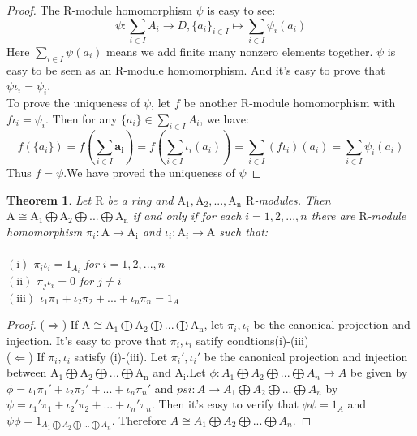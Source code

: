 \documentclass[a4paper]{article}
\newtheorem{myTheo}{Theorem}
\begin{document}
    \begin{proof}
        The $\mathrm{R}$-module homomorphism $\psi$ is easy to see:
        $$
        \psi: \sum_{i\in I}A_i\rightarrow D,\{a_i\}_{i\in I}\mapsto \sum_{i\in I}\psi_i(a_i)
        $$
        Here $\sum_{i\in I}\psi(a_i)$ means we add finite many nonzero elements together. $\psi$ is easy to be seen as an $\mathrm{R}$-module homomorphism. And it's easy to prove that $\psi\iota_i=\psi_i$.\\
        To prove the uniqueness of $\psi$, let $f$ be another $\mathrm{R}$-module homomorphism with $f\iota_i=\psi_i$. Then for any $\{a_i\}\in \sum_{i\in I}A_i$, we have:
        $$
        f(\{a_i\})=f(\sum_{i\in I}\mathbf{a_i})=f(\sum_{i\in I}\iota_i(a_i))=\sum_{i\in I}(f\iota_i)(a_i)=\sum_{i\in I}\psi_i(a_i)
        $$
        Thus $f=\psi$.We have proved the uniqueness of $\psi$
    \end{proof}
    \vspace{0.5cm}
    \begin{myTheo}
        Let $\mathrm{R}$ be a ring and $\mathrm{A_1,A_2,...,A_n}$ $\mathrm{R}$-modules. Then $\mathrm{A}\cong\mathrm{A_1}\bigoplus\mathrm{A_2}\bigoplus...\bigoplus\mathrm{A_n}$ if and only if for each $i=1,2,...,n$ there are $\mathrm{R}$-module homomorphism $\pi_i:\mathrm{A}\rightarrow \mathrm{A_i}$
        and $\iota_i:\mathrm{A}_i\rightarrow \mathrm{A}$ such that:\\
        \vspace{0.05cm}\\
        $\mathrm{(i)}$ $\pi_i\iota_i = 1_{A_i}$ for $i=1,2,...,n$\\
        $\mathrm{(ii)}$ $\pi_j\iota_i=0$ for $j\neq i$\\
        $\mathrm{(iii)}$ $\iota_1\pi_1 + \iota_2\pi_2 +...+\iota_n\pi_n=1_A$
    \end{myTheo}
    \begin{proof}
        ($\Rightarrow$) If $\mathrm{A}\cong \mathrm{A_1}\bigoplus\mathrm{A_2}\bigoplus...\bigoplus\mathrm{A_n}$, let $\pi_i,\iota_i$ be the canonical projection and injection. It's easy to prove
        that $\pi_i,\iota_i$ satify condtions(i)-(iii)\\

        ($\Leftarrow$) If $\pi_i,\iota_i$ satisfy (i)-(iii). Let $\pi_i',\iota_i'$ be the canonical projection and injection between
         $\mathrm{A_1}\bigoplus\mathrm{A_2}\bigoplus...\bigoplus \mathrm{A_n}$ and $\mathrm{A_i}$.Let $\phi:A_1\bigoplus A_2\bigoplus...\bigoplus A_n \rightarrow A$ be given by $\phi=\iota_1\pi_1'+\iota_2\pi_2'+...+\iota_n\pi_n'$ and $psi:A\rightarrow A_1\bigoplus A_2\bigoplus...\bigoplus A_n$ by 
         $\psi=\iota_1'\pi_1+\iota_2'\pi_2+...+\iota_n'\pi_n$. Then it's easy to verify that $\phi\psi=1_A$ and $\psi\phi=1_{A_1\bigoplus A_2\bigoplus...\bigoplus A_n}$. Therefore $A\cong A_1\bigoplus A_2\bigoplus...\bigoplus A_n$.
    \end{proof}
\end{document}
